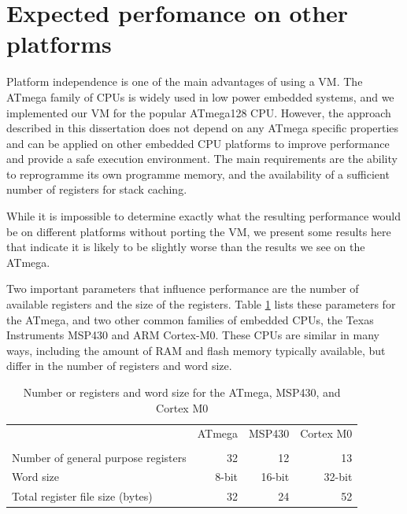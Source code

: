 \section{Expected perfomance on other platforms}
\label{sec-evaluation-other-platforms}
Platform independence is one of the main advantages of using a VM. The ATmega family of CPUs is widely used in low power embedded systems, and we implemented our VM for the popular ATmega128 CPU. However, the approach described in this dissertation does not depend on any ATmega specific properties and can be applied on other embedded CPU platforms to improve performance and provide a safe execution environment. The main requirements are the ability to reprogramme its own programme memory, and the availability of a sufficient number of registers for stack caching.

While it is impossible to determine exactly what the resulting performance would be on different platforms without porting the VM, we present some results here that indicate it is likely to be slightly worse than the results we see on the ATmega.

Two important parameters that influence performance are the number of available registers and the size of the registers. Table \ref{tbl-ATmega-msp430-m0-registers} lists these parameters for the ATmega, and two other common families of embedded CPUs, the Texas Instruments MSP430 and ARM Cortex-M0. These CPUs are similar in many ways, including the amount of RAM and flash memory typically available, but differ in the number of registers and word size.

\begin{table}
\caption{Number or registers and word size for the ATmega, MSP430, and Cortex M0}
\label{tbl-ATmega-msp430-m0-registers}
    \begin{tabular}{lrrr} %
    \toprule
                                           & ATmega       & MSP430     & Cortex M0 \\
                                           & \cite{Atmel:ATmega128Datasheet, Atmel:AVRInstructionSetManual}
                                           & \cite{TexasInstrumentsIncorporated:MSP430F1611Datasheet, TexasInstrumentsIncorporated:MSP430x1xxUsersGuide}
                                           & \cite{ARM:2009vz} \\
    \midrule
    \midrule
    Number of general purpose registers    & 32           & 12         & 13        \\
    Word size                              & 8-bit        & 16-bit     & 32-bit    \\
    Total register file size (bytes)       & 32           & 24         & 52        \\
    \bottomrule
    \end{tabular}
\end{table}

